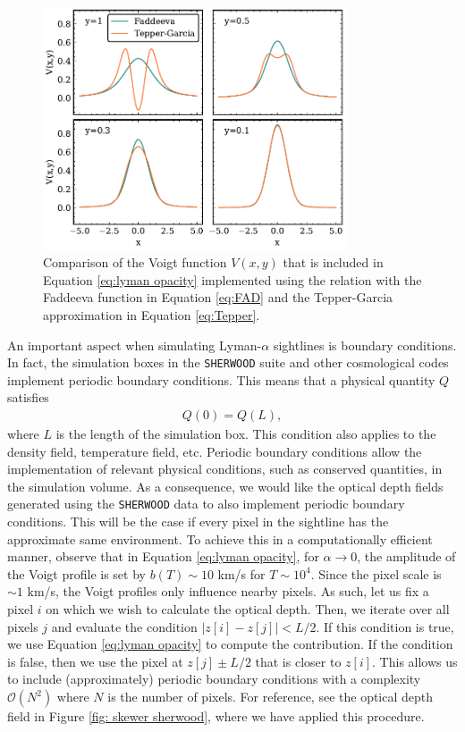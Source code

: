 \begin{figure}[ht]
        \centering
        \includegraphics[width=0.8\textwidth]{img/ML/TP-FA.pdf}
        \caption{Comparison of the Voigt function $V(x,y)$ that is included in Equation \ref{eq:lyman opacity} implemented using the relation with the Faddeeva function in Equation \ref{eq:FAD} and the Tepper-Garcia approximation in Equation \ref{eq:Tepper}.}
        \label{fig: VOIGT APPROX}     
\end{figure}

An important aspect when simulating Lyman-$\alpha$ sightlines is boundary conditions. In fact, the simulation boxes in the \texttt{SHERWOOD} suite and other cosmological codes implement periodic boundary conditions. This means that a physical quantity $Q$ satisfies
\begin{eqnarray}
        Q(0)=Q(L),
\end{eqnarray}
where $L$ is the length of the simulation box. This condition also applies to the density field, temperature field, etc. Periodic boundary conditions allow the implementation of relevant physical conditions, such as conserved quantities, in the simulation volume. As a consequence, we would like the optical depth fields generated using the \texttt{SHERWOOD} data to also implement periodic boundary conditions. This will be the case if every pixel in the sightline has the approximate same environment. To achieve this in a computationally efficient manner, observe that in Equation \ref{eq:lyman opacity}, for $\alpha\to 0$, the amplitude of the Voigt profile is set by $b(T)\sim 10$ km/s for $T\sim 10^4$. Since the pixel scale is $\sim 1$ km/s, the Voigt profiles only influence nearby pixels. As such, let us fix a pixel $i$ on which we wish to calculate the optical depth. Then, we iterate over all pixels $j$ and evaluate the condition $|z[i]-z[j]| < L/2$. If this condition is true, we use Equation \ref{eq:lyman opacity} to compute the contribution. If the condition is false, then we use the pixel at $z[j]\pm L/2$ that is closer to $z[i]$. This allows us to include (approximately) periodic boundary conditions with a complexity $\mathcal{O}(N^2)$ where $N$ is the number of pixels. For reference, see the optical depth field in Figure \ref{fig: skewer sherwood}, where we have applied this procedure.



